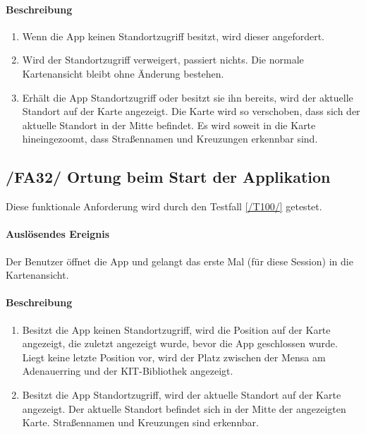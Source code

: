 \paragraph{Beschreibung}
\begin{enumerate}
    \item Wenn die App keinen Standortzugriff besitzt, wird dieser angefordert.
    \item Wird der Standortzugriff verweigert, passiert nichts. Die normale \Gls{Kartenansicht} bleibt ohne Änderung bestehen.
    \item Erhält die App Standortzugriff oder besitzt sie ihn bereits, wird der aktuelle Standort auf der \Gls{Karte} angezeigt. Die \Gls{Karte} wird so verschoben, dass sich der aktuelle Standort in der Mitte befindet. Es wird soweit in die \Gls{Karte} hineingezoomt, dass Straßennamen und Kreuzungen erkennbar sind.
\end{enumerate}

\subsection*{/FA32/ Ortung beim Start der Applikation}
\label{/FA32/}
Diese funktionale Anforderung wird durch den Testfall \ref{/T100/} getestet.
\paragraph{Auslösendes Ereignis}
Der \Gls{Benutzer} öffnet die App und gelangt das erste Mal (für diese Session) in die \Gls{Kartenansicht}.
\paragraph{Beschreibung}
\begin{enumerate}
    \item Besitzt die App keinen Standortzugriff, wird die Position auf der \Gls{Karte} angezeigt, die zuletzt angezeigt wurde, bevor die App geschlossen wurde. Liegt keine letzte Position vor, wird der Platz zwischen der Mensa am Adenauerring und der \Gls{KIT}-Bibliothek angezeigt.
    \item Besitzt die App Standortzugriff, wird der aktuelle Standort auf der \Gls{Karte} angezeigt. Der aktuelle Standort befindet sich in der Mitte der angezeigten \Gls{Karte}. Straßennamen und Kreuzungen sind erkennbar.
\end{enumerate}
